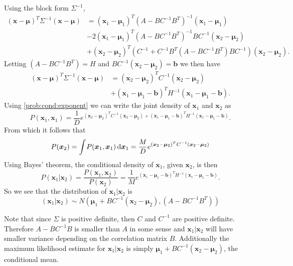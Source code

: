 Using the block form $\Sigma^{-1}$,
\begin{align}
(\bm{x}-\bm{\mu})^T\Sigma^{-1}(\bm{x}-\bm{\mu}) &= (\bm{x}_1-\bm{\mu}_1)^T(A-BC^{-1}B^T)^{-1}(\bm{x}_1-\bm{\mu}_1) \nonumber \\
&-2(\bm{x}_1-\bm{\mu}_1)^T(A-BC^{-1}B^T)^{-1}BC^{-1}(\bm{x}_2-\bm{\mu}_2) \nonumber \\
&+(\bm{x}_2-\bm{\mu}_2)^T(C^{-1}+C^{-1}B^T(A-BC^{-1}B^T)BC^{-1})(\bm{x}_2-\bm{\mu}_2).
\end{align}
Letting $(A-BC^{-1}B^T) = H$ and $BC^{-1}(\bm{x}_2-\bm{\mu}_2)=\bm{b}$ we then have
\begin{align}
(\bm{x}-\bm{\mu})^T\Sigma^{-1}(\bm{x}-\bm{\mu}) &= (\bm{x}_2-\bm{\mu}_2)^TC^{-1}(\bm{x}_2-\bm{\mu}_2) \nonumber \\
&+(\bm{x}_1-\bm{\mu}_1-\bm{b})^TH^{-1}(\bm{x}_1-\bm{\mu}_1-\bm{b}).
\label{prob:cond:exponent}
\end{align}
Using \eqref{prob:cond:exponent} we can write the joint density of $\bm{x}_1$ and $\bm{x}_2$ as
\begin{equation}
P(\bm{x}_1,\bm{x}_1) = \frac{1}{D}e^{(\bm{x}_2-\bm{\mu}_2)^TC^{-1}(\bm{x}_2-\bm{\mu}_2) +(\bm{x}_1-\bm{\mu}_1-\bm{b})^TH^{-1}(\bm{x}_1-\bm{\mu}_1-\bm{b})}.
\end{equation}
From which it follows that
\begin{equation}
P(\bm{x}_2) = \int_{}^{}\! P(\bm{x}_1,\bm{x}_1) \, \mathrm{d}\bm{x}_1 = \frac{M}{D}e^{(\bm{x}_2-\bm{\mu}_2)^TC^{-1}(\bm{x}_2-\bm{\mu}_2)}
\end{equation}
Using Bayes' theorem, the conditional density of $\bm{x}_1$, given $\bm{x}_2$, is then
\begin{equation}
P(\bm{x}_1|\bm{x}_2)=\frac{P(\bm{x}_1,\bm{x}_2)}{P(\bm{x}_2)} = \frac{1}{M}e^{(\bm{x}_1-\bm{\mu}_1-\bm{b})^TH^{-1}(\bm{x}_1-\bm{\mu}_1-\bm{b})}.
\end{equation}
So we see that the distribution of $\bm{x}_1|\bm{x}_2$ is
\begin{equation}
(\bm{x}_1|\bm{x}_2) \sim N(\bm{\mu}_1+BC^{-1}(\bm{x}_2-\bm{\mu}_2), (A-BC^{-1}B^T))
\end{equation}

Note that since $\Sigma$ is positive definite, then $C$ and $C^{-1}$ are positive definite. Therefore $A-BC^{-1}B$ is smaller than $A$ in some sense and $\bm{x}_1|\bm{x}_2$ will have smaller variance depending on the correlation matrix $B$. Additionally the maximum likelihood estimate for $\bm{x}_1|\bm{x}_2$ is simply $\bm{\mu}_1+BC^{-1}(\bm{x}_2-\bm{\mu}_2)$, the conditional mean.